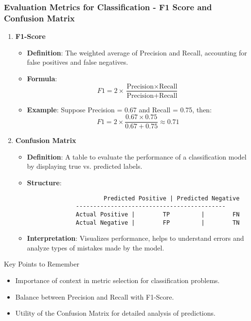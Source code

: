 \documentclass[aspectratio=169]{beamer}
\begin{document}
\begin{frame}[fragile]
  \frametitle{Evaluation Metrics for Classification - F1 Score and Confusion Matrix}
  \begin{enumerate}[resume]
    \item \textbf{F1-Score}
      \begin{itemize}
        \item \textbf{Definition}: The weighted average of Precision and Recall, accounting for false positives and false negatives.
        \item \textbf{Formula}:
          \[
          F1 = 2 \times \frac{\text{Precision} \times \text{Recall}}{\text{Precision} + \text{Recall}}
          \]
        \item \textbf{Example}: Suppose Precision = 0.67 and Recall = 0.75, then:
          \[
          F1 = 2 \times \frac{0.67 \times 0.75}{0.67 + 0.75} \approx 0.71
          \]
      \end{itemize}

    \item \textbf{Confusion Matrix}
      \begin{itemize}
        \item \textbf{Definition}: A table to evaluate the performance of a classification model by displaying true vs. predicted labels.
        \item \textbf{Structure}:
          \begin{verbatim}
                      Predicted Positive | Predicted Negative
              -------------------------------------------
              Actual Positive |        TP         |        FN
              Actual Negative |        FP         |        TN
          \end{verbatim}
        \item \textbf{Interpretation}: Visualizes performance, helps to understand errors and analyze types of mistakes made by the model.
      \end{itemize}
  \end{enumerate}
  
  \begin{block}{Key Points to Remember}
    \begin{itemize}
      \item Importance of context in metric selection for classification problems.
      \item Balance between Precision and Recall with F1-Score.
      \item Utility of the Confusion Matrix for detailed analysis of predictions.
    \end{itemize}
  \end{block}
\end{frame}
\end{document}
